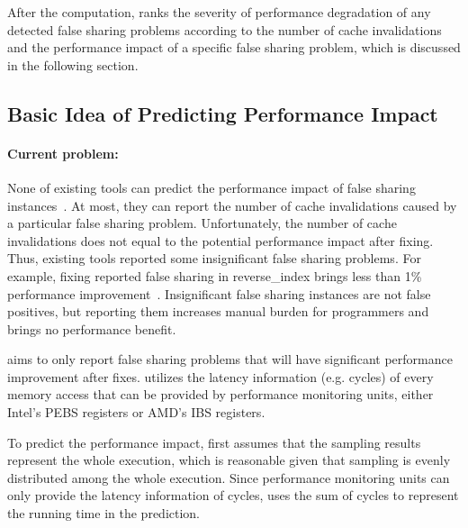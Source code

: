       
After the computation, 
\cheetah{} ranks the severity of performance degradation of any detected false sharing problems according to the number of cache invalidations and the performance impact of a specific false sharing problem, which is discussed in the following section.  

\subsection{Basic Idea of Predicting Performance Impact}
\label{sec:predictidea}

\paragraph{Current problem:} None of existing tools can predict the performance impact of false sharing instances~\cite{sheriff, Predator, openmp}. At most, they can report the number of cache invalidations caused by a particular false sharing problem. Unfortunately, the number of cache invalidations does not equal to the potential performance impact after fixing. Thus, existing tools reported some insignificant false sharing problems. For example, fixing reported false sharing in reverse\_index brings less than 1\% performance improvement~\cite{sheriff, Predator}. Insignificant false sharing instances are not false positives, but reporting them increases manual burden for programmers and brings no performance benefit. 

\Cheetah{} aims to only report false sharing problems that will have significant performance improvement after fixes. \Cheetah{} utilizes the latency information (e.g. cycles) of every memory access that can be provided by performance monitoring units, either Intel's PEBS registers or AMD's IBS registers. 

To predict the performance impact, \Cheetah{} first assumes that the sampling results represent the whole execution, which is reasonable given that sampling is evenly distributed among the whole execution. Since performance monitoring units can only provide the latency information of cycles, \Cheetah{} uses the sum of cycles to represent the running time in the prediction.  

